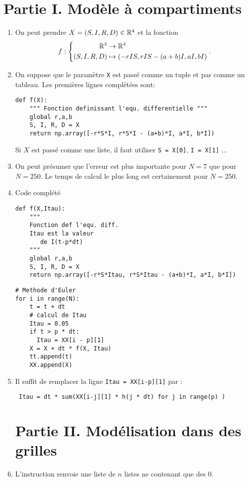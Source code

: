 \section*{Partie I. Mod\`ele \`a compartiments}
\begin{enumerate}
 \item On peut prendre $X = (S,I,R,D) \in \mathbb{R}^4$ et la fonction
 \[
  f:
  \left\lbrace 
  \begin{aligned}
   \mathbb{R}^4 &\rightarrow \mathbb{R}^4 \\
   (S,I,R,D) &\mapsto (-rIS, rIS - (a+b)I, aI, bI)
  \end{aligned}
\right. .
 \]

 \item On suppose que le paramètre \texttt{X} est passé comme un tuple et pas comme un tableau. Les premières lignes complétées sont:
\begin{lstlisting}
def f(X):
	""" Fonction definissant l'equ. differentielle """
	global r,a,b
	S, I, R, D = X
	return np.array([-r*S*I, r*S*I - (a+b)*I, a*I, b*I])
\end{lstlisting}
Si $X$ est passé comme une liste, il faut utiliser \texttt{S = X[0]}, \texttt{I = X[1]} ...

 \item On peut présumer que l'erreur est plus importante pour $N = 7$ que pour $N = 250$. Le temps de calcul le plus long est certainement pour $N = 250$.
 
 \item Code complété
\begin{lstlisting}
def f(X,Itau):
	"""
	Fonction def l'equ. diff.
	Itau est la valeur 
	   de I(t-p*dt)	
	"""
	global r,a,b
	S, I, R, D = X
	return np.array([-r*S*Itau, r*S*Itau - (a+b)*I, a*I, b*I])
\end{lstlisting}
\begin{lstlisting}
# Methode d'Euler
for i in range(N):
	t = t + dt
	# calcul de Itau
	Itau = 0.05
	if t > p * dt:
	  Itau = XX[i - p][1]
	X = X + dt * f(X, Itau)
	tt.append(t)
	XX.append(X)
\end{lstlisting}

 \item Il suffit de remplacer la ligne \texttt{Itau = XX[i-p][1]} par :
\begin{lstlisting}
 Itau = dt * sum(XX[i-j][1] * h(j * dt) for j in range(p) )
\end{lstlisting}



\section*{Partie II. Mod\'elisation dans des grilles}
 \item L'instruction renvoie une liste de $n$ listes ne contenant que des $0$.
 

\end{enumerate}
